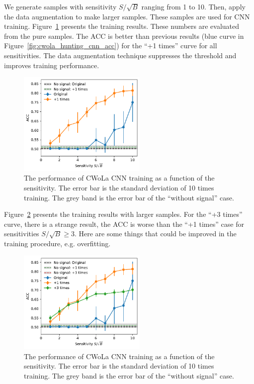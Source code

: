 \documentclass[12pt]{article}
\begin{document}
        We generate samples with sensitivity $S / \sqrt{B}$ ranging from 1 to 10. Then, apply the data augmentation to make larger samples. These samples are used for CNN training. Figure~\ref{fig:cwola_hunting_cnn_acc_data_augmetation} presents the training results. These numbers are evaluated from the pure samples. The ACC is better than previous results (blue curve in Figure~\ref{fig:cwola_hunting_cnn_acc}) for the ``+1 times'' curve for all sensitivities. The data augmentation technique suppresses the threshold and improves training performance.

        \begin{figure}[htpb]
            \centering
            \includegraphics[width=0.55\textwidth]{HVmodel_CWoLa_CNN_aug_1.pdf}
            \caption{The performance of CWoLa CNN training as a function of the sensitivity. The error bar is the standard deviation of 10 times training. The grey band is the error bar of the ``without signal'' case.}
            \label{fig:cwola_hunting_cnn_acc_data_augmetation}
        \end{figure}

         Figure~\ref{fig:cwola_hunting_cnn_acc_data_augmetation_3_times} presents the training results with larger samples. For the ``+3 times'' curve, there is a strange result, the ACC is worse than the ``+1 times'' case for sensitivities $S / \sqrt{B} \ge 3$. Here are some things that could be improved in the training procedure, e.g. overfitting.
        \begin{figure}[htpb]
            \centering
            \includegraphics[width=0.55\textwidth]{HVmodel_CWoLa_CNN_aug_1_3.pdf}
            \caption{The performance of CWoLa CNN training as a function of the sensitivity. The error bar is the standard deviation of 10 times training. The grey band is the error bar of the ``without signal'' case.}
            \label{fig:cwola_hunting_cnn_acc_data_augmetation_3_times}
        \end{figure}
\end{document}
